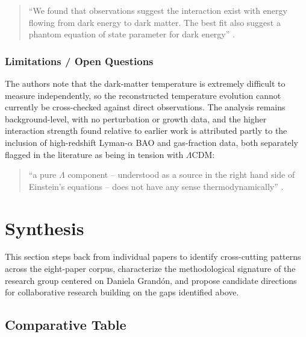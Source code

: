 \documentclass[11pt]{article}
\begin{document}
\begin{quote}
\enquote{We found that observations suggest the interaction exist with energy flowing from dark energy to dark matter. The best fit also suggest a phantom equation of state parameter for dark energy} \citep[p.~1]{cardenas2018thermodynamics}.
\end{quote}

\subsubsection{Limitations / Open Questions}
The authors note that the dark-matter temperature is extremely difficult to measure independently, so the reconstructed temperature evolution cannot currently be cross-checked against direct observations. The analysis remains background-level, with no perturbation or growth data, and the higher interaction strength found relative to earlier work is attributed partly to the inclusion of high-redshift Lyman-$\alpha$ BAO and gas-fraction data, both separately flagged in the literature as being in tension with $\Lambda$CDM:

\begin{quote}
\enquote{a pure $\Lambda$ component -- understood as a source in the right hand side of Einstein's equations -- does not have any sense thermodynamically} \citep[p.~13]{cardenas2018thermodynamics}.
\end{quote}

\section{Synthesis}
\label{sec:synthesis}

This section steps back from individual papers to identify cross-cutting patterns across the eight-paper corpus, characterize the methodological signature of the research group centered on Daniela Grandón, and propose candidate directions for collaborative research building on the gaps identified above.

\subsection{Comparative Table}
\end{document}
